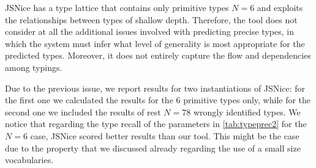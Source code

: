 \documentclass[sigplan,10pt,anonymous]{acmart} %
\theoremstyle{plain}
\theoremstyle{remark}
\theoremstyle{definition}
\begin{document}
JSNice has a type lattice that contains only primitive types $N = 6$ and exploits the relationships between types of shallow depth.
Therefore, the tool does not consider at all the additional issues involved with predicting precise types, in which the system must infer what level of generality is most appropriate for the predicted types.
Moreover, it does not entirely capture the flow and dependencies among typings.

Due to the previous issue, we report results for two instantiations of JSNice: for the first one we calculated the results for the $6$ primitive types only, while for the second one we included the results of rest $N=78$ wrongly identified types.
We notice that regarding the type recall of the parameters in \cref{tab:typeprec2} for the $N = 6$ case, JSNice scored better results than our tool.
This might be the case due to the property that we discussed already regarding the use of a small size vocabularies.
\end{document}
